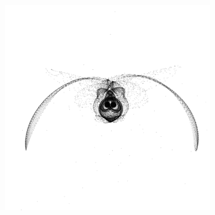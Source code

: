 \documentclass[11pt,twocolumn]{article}
\begin{document}
                
         \begin{figure}[!tbp]
         \captionsetup[subfigure]{labelformat=empty}

			\centering
            \begin{subfigure}[b]{0.9\textwidth}
            \includegraphics[width=\textwidth, trim={0 4cm 0 6cm}, clip]{Antennae/Ant_9_000000_140.pdf}
  			\end{subfigure}%
            
            
            

\end{figure}
\end{document}
